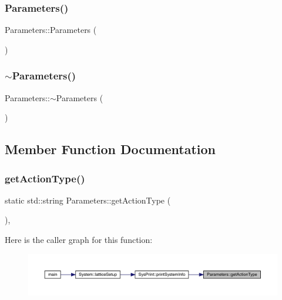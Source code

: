 \subsubsection{\texorpdfstring{Parameters()}{Parameters()}}
{\footnotesize\ttfamily Parameters\+::\+Parameters (\begin{DoxyParamCaption}{ }\end{DoxyParamCaption})}

\mbox{\label{class_parameters_a640a1a349975a8cb023696f25e563a5c}} 
\subsubsection{\texorpdfstring{$\sim$Parameters()}{~Parameters()}}
{\footnotesize\ttfamily Parameters\+::$\sim$\+Parameters (\begin{DoxyParamCaption}{ }\end{DoxyParamCaption})}



\subsection{Member Function Documentation}
\mbox{\label{class_parameters_afc824aec2ab48afe06829050d0fbe966}} 
\subsubsection{\texorpdfstring{getActionType()}{getActionType()}}
{\footnotesize\ttfamily static std\+::string Parameters\+::get\+Action\+Type (\begin{DoxyParamCaption}{ }\end{DoxyParamCaption})\hspace{0.3cm}{\ttfamily [inline]}, {\ttfamily [static]}}

Here is the caller graph for this function\+:\nopagebreak
\begin{figure}[H]
\begin{center}
\leavevmode
\includegraphics[width=350pt]{class_parameters_afc824aec2ab48afe06829050d0fbe966_icgraph}
\end{center}
\end{figure}
\mbox{\label{class_parameters_a181a773d23fdb19d0c4f35e6cf2d5649}} 
